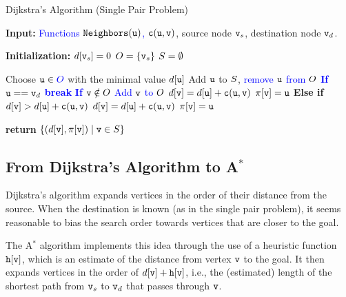 \begin{algorithm}
\caption{Dijkstra's Algorithm (Single Pair Problem)}
\label{Alg:DijkstraSinglePair}
\begin{algorithmic}[1]
\State \textbf{Input:} \textcolor{blue}{Functions $\texttt{Neighbors}({\tt u})$, ${\tt c}({\tt u}, {\tt v})$}, source node ${\tt v}_s$, destination node ${\tt v}_d$.

\State \textbf{Initialization:} 
\State \quad $d[{\tt v}_s] = 0$
\textcolor{blue}{\State \quad ${O} = \{{\tt v}_s\}$}
\State \quad ${S} = \emptyset$

\While{\textcolor{blue}{$\openset \neq \emptyset$}}
    \State Choose ${\tt u} \in \textcolor{blue}{{O}}$ with the minimal value $d[{\tt u}]$
    \State Add ${\tt u}$ to ${S}$, \textcolor{blue}{remove ${\tt u}$ from ${O}$}
    \State \textcolor{blue}{\textbf{If} {${\tt u} == {\tt v}_d$}}
        \State \quad \textcolor{blue}{\textbf{break}}
        \State \textcolor{blue}{\textbf{If} ${\tt v} \notin {O}$}
        \State \textcolor{blue}{\quad Add ${\tt v}$ to ${O}$}
        \State \textcolor{blue}{\quad $d[{\tt v}] = d[{\tt u}] + {\tt c}({\tt u}, {\tt v})$}
        \State \textcolor{blue}{\quad $\pi[{\tt v}] = {\tt u}$}
        \State \textbf{Else if} {$d[{\tt v}] > d[{\tt u}] + {\tt c}({\tt u}, {\tt v})$}
            \State \quad $d[{\tt v}] = d[{\tt u}] + {\tt c}({\tt u}, {\tt v})$
            \State \quad $\pi[{\tt v}] = {\tt u}$
    \EndFor
\EndWhile

\State \textbf{return} $\{(d[{\tt v}], \pi[{\tt v}]) \mid {\tt v} \in {S}\}$
\end{algorithmic}
\end{algorithm}

\subsection{From Dijkstra's Algorithm to A$^*$}

Dijkstra's algorithm expands vertices in the order of their distance from the source. When the destination is known (as in the single pair problem), it seems reasonable to bias the search order towards vertices that are closer to the goal. 

The A$^*$ algorithm implements this idea through the use of a heuristic function ${\tt h}[{\tt v}]$, which is an estimate of the distance from vertex ${\tt v}$ to the goal. It then expands vertices in the order of $d[{\tt v}] + {\tt h}[{\tt v}]$, i.e., the (estimated) length of the shortest path from ${\tt v}_s$ to ${\tt v}_d$ that passes through ${\tt v}$.

